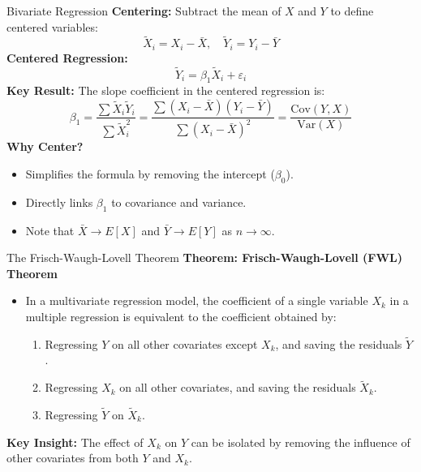 \documentclass[xcolor=svgnames,t]{beamer}
\begin{document}
\begin{frame}{Bivariate Regression}
    \textbf{Centering:} Subtract the mean of \(X\) and \(Y\) to define centered variables:
    \[
    \tilde{X}_i = X_i - \bar{X}, \quad \tilde{Y}_i = Y_i - \bar{Y}
    \]
    \pause
    \textbf{Centered Regression:}
    \[
    \tilde{Y}_i = \beta_1 \tilde{X}_i + \varepsilon_i
    \]
    \pause
    \textbf{Key Result:}
    The slope coefficient in the centered regression is:
    \[
    \beta_1 = \frac{\sum \tilde{X}_i \tilde{Y}_i}{\sum \tilde{X}_i^2} = \frac{\sum (X_i - \bar{X})(Y_i - \bar{Y})}{\sum (X_i - \bar{X})^2} = \frac{\text{Cov}(Y, X)}{\text{Var}(X)}
    \]
    \pause
    \textbf{Why Center?}
    \begin{itemize}
        \item Simplifies the formula by removing the intercept (\(\beta_0\)).
        \item Directly links \(\beta_1\) to covariance and variance.
        \item Note that \(\bar{X} \to E[X]\) and \(\bar{Y} \to E[Y]\) as \(n \to \infty\).
    \end{itemize}
\end{frame}

\begin{frame}{The Frisch-Waugh-Lovell Theorem}
    \textbf{Theorem: Frisch-Waugh-Lovell (FWL) Theorem}
    \begin{itemize}
        \item In a multivariate regression model, the coefficient of a single variable \(X_k\) in a multiple regression is equivalent to the coefficient obtained by:
        \pause
        \begin{enumerate}
            \item Regressing \(Y\) on all other covariates except \(X_k\), and saving the residuals \( \tilde{Y} \).
            \pause
            \item Regressing \(X_k\) on all other covariates, and saving the residuals \( \tilde{X}_k \).
            \pause
            \item Regressing \( \tilde{Y} \) on \( \tilde{X}_k \).
        \end{enumerate}
    \end{itemize}
    \pause
    \textbf{Key Insight:}  
    The effect of \(X_k\) on \(Y\) can be isolated by removing the influence of other covariates from both \(Y\) and \(X_k\).
\end{frame}
\end{document}
